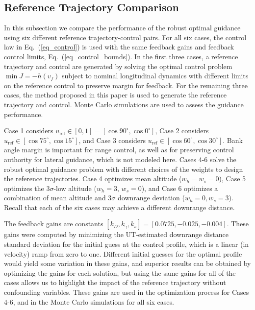 \documentclass[journal ]{new-aiaa}
\begin{document}
\subsection*{Reference Trajectory Comparison}
In this subsection we compare the performance of the robust optimal guidance using six different reference trajectory-control pairs. For all six cases, the control law in Eq.~(\ref{eq_control}) is used with the same feedback gains and feedback control limits, Eq.~(\ref{eq_control_bounds}). In the first three cases, a reference trajectory and control are generated by solving the optimal control problem $\min J = -h(v_f)$ subject to nominal longitudinal dynamics with different limits on the reference control to preserve margin for feedback. For the remaining three cases, the method proposed in this paper is used to generate the reference trajectory and control. Monte Carlo simulations are used to assess the guidance performance.

Case 1 considers $u_{\mathrm{ref}}\in[0,1] = [\cos90^{\circ},\cos0^{\circ}]$, Case 2 considers $u_{\mathrm{ref}}\in [\cos75^{\circ},\cos15^{\circ}]$, and Case 3 considers $u_{\mathrm{ref}}\in [\cos60^{\circ},\cos30^{\circ}]$.
Bank angle margin is important for range control, as well as for preserving control authority for lateral guidance, which is not modeled here. 
Cases 4-6 solve the robust optimal guidance problem with different choices of the weights to design the reference trajectories. Case 4 optimizes mean altitude ($ w_h=w_s=0 $), Case 5 optimizes the 3$\sigma$-low altitude ($ w_h=3,\,w_s=0 $), and Case 6 optimizes a combination of mean altitude and 3$\sigma$ downrange deviation ($ w_h=0, w_s=3 $). Recall that each of the six cases may achieve a different downrange distance.

The feedback gains are constants $[k_D, k_{\gamma}, k_s] = [0.0725, -0.025, -0.004]$.  These gains were computed by minimizing the UT-estimated downrange distance standard deviation for the initial guess at the control profile, which is a linear (in velocity) ramp from zero to one. Different initial guesses for the optimal profile would yield some variation in these gains, and superior results can be obtained by optimizing the gains for each solution, but using the same gains for all of the cases allows us to highlight the impact of the reference trajectory without confounding variables. These gains are used in the optimization process for Cases 4-6, and in the Monte Carlo simulations for all six cases. 
\end{document}
